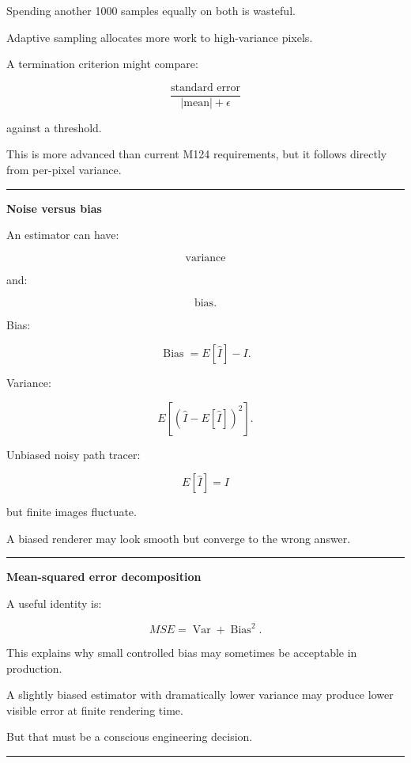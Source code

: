 Spending another 1000 samples equally on both is wasteful.

Adaptive sampling allocates more work to high-variance pixels.

A termination criterion might compare:

\[
\frac{
\text{standard error}
}{
|\text{mean}|+\epsilon
}
\]

against a threshold.

This is more advanced than current M124 requirements, but it follows directly from per-pixel variance.

\begin{center}\rule{0.5\linewidth}{0.5pt}\end{center}

\textbf{Noise versus bias}

An estimator can have:

\[
\text{variance}
\]

and:

\[
\text{bias}.
\]

Bias:

\[
\boxed{
\operatorname{Bias}
=
E[\hat I]-I.
}
\]

Variance:

\[
\boxed{
E[
(\hat I-E[\hat I])^2
].
}
\]

Unbiased noisy path tracer:

\[
E[\hat I]=I
\]

but finite images fluctuate.

A biased renderer may look smooth but converge to the wrong answer.

\begin{center}\rule{0.5\linewidth}{0.5pt}\end{center}

\textbf{Mean-squared error decomposition}

A useful identity is:

\[
\boxed{
MSE
=
\operatorname{Var}
+
\operatorname{Bias}^2.
}
\]

This explains why small controlled bias may sometimes be acceptable in production.

A slightly biased estimator with dramatically lower variance may produce lower visible error at finite rendering time.

But that must be a conscious engineering decision.

\begin{center}\rule{0.5\linewidth}{0.5pt}\end{center}


